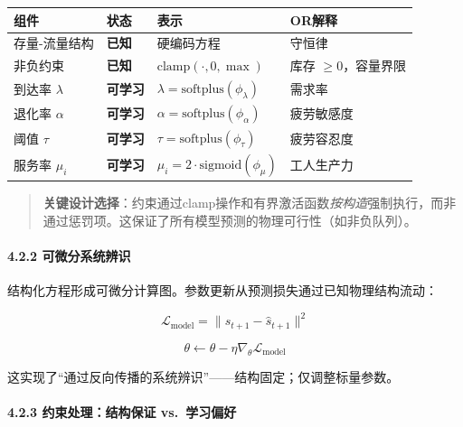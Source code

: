 \documentclass[UTF8]{ctexart}
\let\oldparagraph\paragraph
\renewcommand{\paragraph}[1]{\oldparagraph{#1}\mbox{}}
\begin{document}
\begin{table}[h]
\centering
\begin{tabular}{p{3cm}p{2cm}p{4cm}p{5cm}}
\toprule
\textbf{组件} & \textbf{状态} & \textbf{表示} & \textbf{OR解释} \\
\midrule
存量-流量结构 & \textbf{已知} & 硬编码方程 & 守恒律 \\
非负约束 & \textbf{已知} & \(\text{clamp}(\cdot, 0, \max)\) & 库存 \(\geq 0\)，容量界限 \\
到达率 \(\lambda\) & \textbf{可学习} & \(\lambda = \text{softplus}(\phi_\lambda)\) & 需求率 \\
退化率 \(\alpha\) & \textbf{可学习} & \(\alpha = \text{softplus}(\phi_\alpha)\) & 疲劳敏感度 \\
阈值 \(\tau\) & \textbf{可学习} & \(\tau = \text{softplus}(\phi_\tau)\) & 疲劳容忍度 \\
服务率 \(\mu_i\) & \textbf{可学习} & \(\mu_i = 2 \cdot \text{sigmoid}(\phi_\mu)\) & 工人生产力 \\
\bottomrule
\end{tabular}
\end{table}

\begin{quote}
\textbf{关键设计选择}：约束通过clamp操作和有界激活函数\emph{按构造}强制执行，而非通过惩罚项。这保证了所有模型预测的物理可行性（如非负队列）。
\end{quote}

\hypertarget{ux53efux5faeux5206ux7cfbux7edfux8fa8ux8bc6}{%
\paragraph{4.2.2
可微分系统辨识}\label{ux53efux5faeux5206ux7cfbux7edfux8fa8ux8bc6}}

结构化方程形成可微分计算图。参数更新从预测损失通过已知物理结构流动：

\[
\mathcal{L}_{\text{model}} = \|s_{t+1} - \hat{s}_{t+1}\|^2
\]

\[
\theta \leftarrow \theta - \eta \nabla_\theta \mathcal{L}_{\text{model}}
\]

这实现了``通过反向传播的系统辨识''------结构固定；仅调整标量参数。

\hypertarget{ux7ea6ux675fux5904ux7406ux7ed3ux6784ux4fddux8bc1-vs.ux5b66ux4e60ux504fux597d}{%
\paragraph{4.2.3 约束处理：结构保证
vs.~学习偏好}\label{ux7ea6ux675fux5904ux7406ux7ed3ux6784ux4fddux8bc1-vs.ux5b66ux4e60ux504fux597d}}
\end{document}
